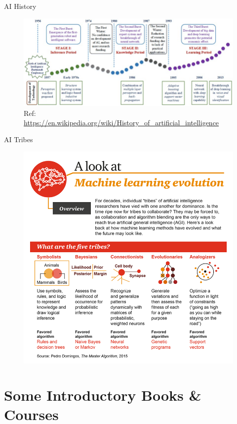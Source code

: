\documentclass{../TexTemplate/myslide}
\begin{document}
\begin{frame}{AI History}
\begin{figure}
\centering
\includegraphics[width=\linewidth]{fig/AI-history.jpg}
\caption*{\scriptsize Ref: \url{https://en.wikipedia.org/wiki/History_of_artificial_intelligence}}
\end{figure}
\end{frame}

\begin{frame}{AI Tribes}
\begin{figure}
\centering
\includegraphics[width=0.6\linewidth]{fig/A-Look-at-Machine-Learning-Evolution.png}
\end{figure}
\end{frame}

\section{Some Introductory Books \& Courses}
\begin{frame}
\sectionpage
\end{frame}
\end{document}
